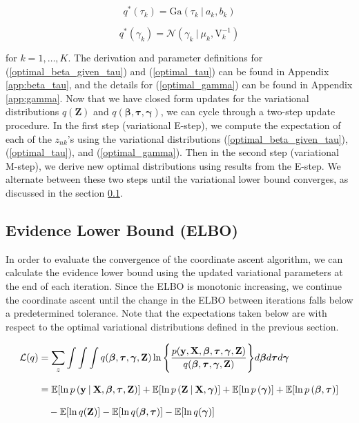 \documentclass[twoside,11pt]{article}
\newcommand\given[1][]{\:#1\vert\:}
\newcommand{\boldbeta}{\boldsymbol\beta}
\newcommand{\boldgamma}{\boldsymbol\gamma}
\newcommand{\boldtau}{\boldsymbol\tau}
\newcommand{\E}{\mathbb{E}}
\newcommand{\pr}[1]{p \left( #1 \right)}
\begin{document}
\begin{equation} \label{optimal_tau}
	q^{*}(\tau_k) =  \mathrm{Ga}\left( \tau_k \given a_k, b_k \right)
\end{equation}

\begin{equation} \label{optimal_gamma}
	q^{*}(\gamma_k) = \mathcal{N} \left( \gamma_k \given \mu_k, \mathrm{V}_k^{-1} \right)
\end{equation}

for $k = 1, \ldots, K$. The derivation and parameter definitions for (\ref{optimal_beta_given_tau}) and (\ref{optimal_tau}) can be found in Appendix \ref{app:beta_tau}, and the details for (\ref{optimal_gamma}) can be found in Appendix \ref{app:gamma}. Now that we have closed form updates for the variational distributions $q(\mathbf{Z})$ and $q(\boldbeta, \boldtau, \boldgamma)$, we can cycle through a two-step update procedure. In the first step (variational E-step), we compute the expectation of each of the $z_{nk}$'s using the variational distributions (\ref{optimal_beta_given_tau}), (\ref{optimal_tau}), and (\ref{optimal_gamma}). Then in the second step (variational M-step), we derive new optimal distributions using results from the E-step. We alternate between these two steps until the variational lower bound converges, as discussed in the section \ref{sub:elbo}. 


\subsection{Evidence Lower Bound (ELBO)} \label{sub:elbo}
In order to evaluate the convergence of the coordinate ascent algorithm, we can calculate the evidence lower bound using the updated variational parameters at the end of each iteration. Since the ELBO is monotonic increasing, we continue the coordinate ascent until the change in the ELBO between iterations falls below a predetermined tolerance. Note that the expectations taken below are with respect to the optimal variational distributions defined in the previous section.

\begin{equation} \label{eq:ELBO}
\setlength{\jot}{11pt}
\begin{split}
	\mathcal{L}(q) &= \sum_{z} \int \int \int q(\boldbeta, \boldtau, \boldgamma, \mathbf{Z})
	\ln \Bigg\{ \frac{p(\mathbf{y}, \mathbf{X}, \boldbeta, \boldtau, \boldgamma, \mathbf{Z})}{q(\boldbeta, \boldtau, \boldgamma, \mathbf{Z})}\Bigg\} d\boldbeta d\boldtau d\boldgamma \\
	&= \E[\ln\pr{\mathbf{y} \given \mathbf{X}, \boldbeta, \boldtau, \mathbf{Z}}] + 
	\E[\ln \pr{\mathbf{Z} \given \mathbf{X}, \boldgamma}] + \E[\ln \pr{\boldgamma}] + \E[\ln \pr{\boldbeta, \boldtau}] \\
	& \quad - \E[\ln q(\mathbf{Z})] - \E[\ln q(\boldbeta, \boldtau)] - \E[\ln q(\boldgamma)]
\end{split}
\end{equation}
\end{document}
